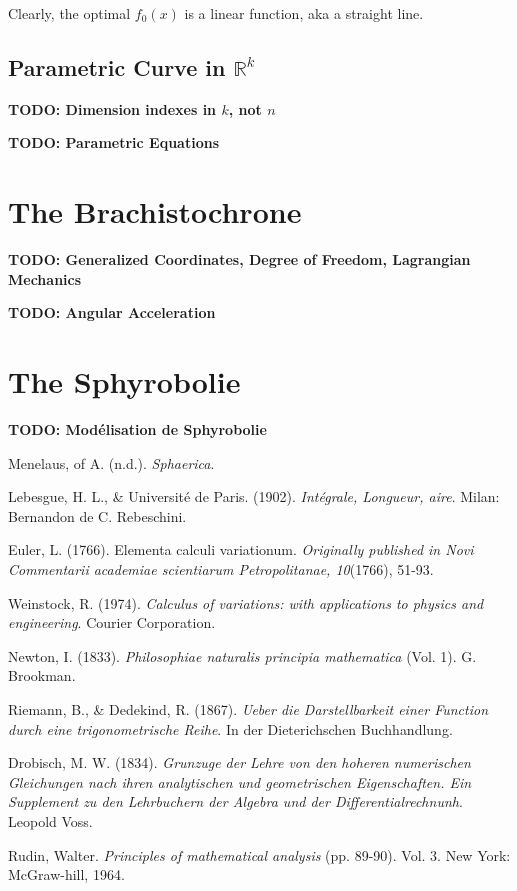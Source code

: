 \documentclass[12pt,a4paper]{article}
\begin{document}
Clearly, the optimal $f_0(x)$ is a linear function, aka a straight line.

\subsection{Parametric Curve in $\mathbb{R}^k$}
\textbf{TODO: Dimension indexes in $k$, not $n$}

\textbf{TODO: Parametric Equations}

\section{The Brachistochrone}
\textbf{TODO: Generalized Coordinates, Degree of Freedom, Lagrangian Mechanics}

\textbf{TODO: Angular Acceleration}

\section{The Sphyrobolie}
\textbf{TODO: Modélisation de Sphyrobolie}

\pagebreak
\begin{thebibliography}{9}
Menelaus, of A. (n.d.). \textit{Sphaerica}.

Lebesgue, H. L., \& Université de Paris. (1902). \textit{Intégrale, Longueur, aire}. Milan: Bernandon de C. Rebeschini.

Euler, L. (1766). Elementa calculi variationum. \textit{Originally published in Novi Commentarii academiae scientiarum Petropolitanae, 10}(1766), 51-93.

Weinstock, R. (1974). \textit{Calculus of variations: with applications to physics and engineering}. Courier Corporation.

Newton, I. (1833). \textit{Philosophiae naturalis principia mathematica} (Vol. 1). G. Brookman.

Riemann, B., \& Dedekind, R. (1867). \textit{Ueber die Darstellbarkeit einer Function durch eine trigonometrische Reihe}. In der Dieterichschen Buchhandlung.

Drobisch, M. W. (1834). \textit{Grunzuge der Lehre von den hoheren numerischen Gleichungen nach ihren analytischen und geometrischen Eigenschaften. Ein Supplement zu den Lehrbuchern der Algebra und der Differentialrechnunh}. Leopold Voss.

Rudin, Walter. \textit{Principles of mathematical analysis} (pp. 89-90). Vol. 3. New York: McGraw-hill, 1964.

\end{thebibliography}
\end{document}
